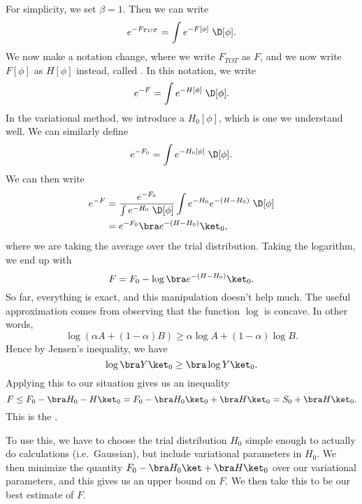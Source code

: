 \documentclass[a4paper]{article}
\begin{document}
For simplicity, we set $\beta = 1$. Then we can write
\[
  e^{-F_{TOT}} = \int e^{-F[\phi]}\;\D [\phi].
\]
We now make a notation change, where we write $F_{TOT}$ as $F$, and we now write $F[\phi]$ as $H[\phi]$ instead, called . In this notation, we write
\[
  e^{-F} = \int e^{-H[\phi]} \;\D [\phi].
\]
In the variational method, we introduce a  $H_0[\phi]$, which is one we understand well. We can similarly define
\[
  e^{-F_0} = \int e^{-H_0[\phi]} \;\D [\phi].
\]
We can then write
\begin{align*}
  e^{-F} &= \frac{e^{-F_0}}{\int e^{-H_0}\;\D [\phi]} \int e^{-H_0} e^{-(H - H_0)}\;\D [\phi] \\
  &= e^{-F_0} \bra e^{-(H - H_0)} \ket_0,
\end{align*}
where we are taking the average over the trial distribution. Taking the logarithm, we end up with
\[
  F = F_0 - \log \bra e^{-(H - H_0)}\ket_0.
\]
So far, everything is exact, and this manipulation doesn't help much. The useful approximation comes from observing that the function $\log$ is concave. In other words,
\[
  \log (\alpha A + (1 - \alpha) B) \geq \alpha \log A + (1 - \alpha) \log B.
\]
Hence by Jensen's inequality, we have
\[
  \log \bra Y \ket_0 \geq \bra \log Y \ket_0.
\]
Applying this to our situation gives us an inequality
\[
  F \leq F_0 - \bra H_0 - H\ket_0 = F_0 - \bra H_0\ket_0 + \bra H\ket_0 = S_0 + \bra H\ket_0.
\]
This is the .

To use this, we have to choose the trial distribution $H_0$ simple enough to actually do calculations (i.e.\ Gaussian), but include variational parameters in $H_0$. We then minimize the quantity $F_0 - \bra H_0\ket + \bra H\ket_0$ over our variational parameters, and this gives us an upper bound on $F$. We then take this to be our best estimate of $F$.
\end{document}
